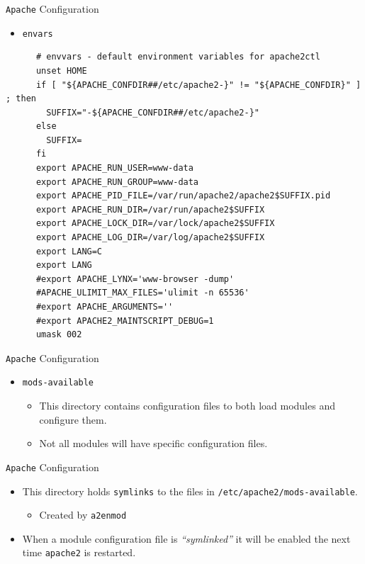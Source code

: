 \documentclass[xcolor=table]{beamer}
\begin{document}
\begin{frame}[fragile]{\texttt{Apache} Configuration}
  \begin{itemize}
    \item \texttt{envars}
  \end{itemize}
  \begin{tcolorbox}
    \lstset{
      basicstyle=\tiny\ttfamily,
    }
    \begin{lstlisting}
      # envvars - default environment variables for apache2ctl
      unset HOME
      if [ "${APACHE_CONFDIR##/etc/apache2-}" != "${APACHE_CONFDIR}" ] ; then
        SUFFIX="-${APACHE_CONFDIR##/etc/apache2-}"
      else
        SUFFIX=
      fi
      export APACHE_RUN_USER=www-data
      export APACHE_RUN_GROUP=www-data
      export APACHE_PID_FILE=/var/run/apache2/apache2$SUFFIX.pid
      export APACHE_RUN_DIR=/var/run/apache2$SUFFIX
      export APACHE_LOCK_DIR=/var/lock/apache2$SUFFIX
      export APACHE_LOG_DIR=/var/log/apache2$SUFFIX
      export LANG=C
      export LANG
      #export APACHE_LYNX='www-browser -dump'
      #APACHE_ULIMIT_MAX_FILES='ulimit -n 65536'
      #export APACHE_ARGUMENTS=''
      #export APACHE2_MAINTSCRIPT_DEBUG=1
      umask 002
    \end{lstlisting}
  \end{tcolorbox}
\end{frame}

\begin{frame}{\texttt{Apache} Configuration}
  \begin{itemize}
    \item \texttt{mods-available}
      \begin{itemize}
        \item This directory contains configuration files to both load modules and configure them. 
        \item Not all modules will have specific configuration files.
      \end{itemize}
  \end{itemize}
\end{frame}

\begin{frame}{\texttt{Apache} Configuration}
  \begin{itemize}
    \item This directory holds \texttt{symlinks} to the files in \texttt{/etc/apache2/mods-available}. 
      \begin{itemize}
        \item Created by \texttt{a2enmod}
      \end{itemize}
    \item When a module configuration file is \textit{``symlinked''} it will be enabled the next time \texttt{apache2} is restarted.
  \end{itemize}
\end{frame}
\end{document}
